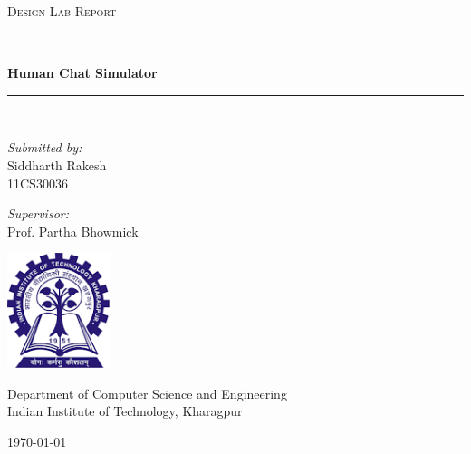 \documentclass[12pt,a4paper]{article}
\newcommand{\HRule}{\rule{\linewidth}{0.5mm}}
\begin{document}


\begin{titlepage}
\begin{center}



\textsc{\Large Design Lab Report }\\[0.5cm]

\HRule \\[0.4cm]
{ \huge \bfseries Human Chat Simulator \\[0.4cm] }

\HRule \\[2.5cm]

\begin{center}
\emph{Submitted by:}\\
\large Siddharth Rakesh\\
11CS30036
\end{center}

\vspace{0.5cm}

\begin{center}
\emph{Supervisor:} \\
\large Prof. Partha Bhowmick
\end{center}

\vfill

\begin{center}
\includegraphics[width=3cm]{kgp-logo.png}
\end{center}

\large Department of Computer Science and Engineering\\
\large Indian Institute of Technology, Kharagpur

\vspace{1cm}

{\large \today}

\end{center}
\end{titlepage}
\end{document}
